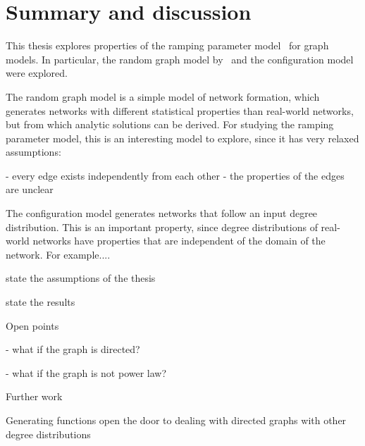 \chapter{Summary and discussion} %
\label{cha:discussion}

This thesis explores properties of the ramping parameter model~\cite{Sindel:2009} for graph models.
In particular, the random graph model by~\cite{} and the configuration model were explored.


The random graph model is a simple model of network formation, which generates networks with different statistical properties than real-world networks, but from which analytic solutions can be derived.
For studying the ramping parameter model, this is an interesting model to explore, since it has very relaxed assumptions:
\begin{itemize}
- every edge exists independently from each other
- the properties of the edges are unclear
\end{itemize}

The configuration model generates networks that follow an input degree distribution.
This is an important property, since degree distributions of real-world networks have properties that are independent of the domain of the network.
For example....



state the assumptions of the thesis

state the results

Open points

- what if the graph is directed?

- what if the graph is not power law?



Further work


Generating functions open the door to dealing with directed graphs with other degree distributions







